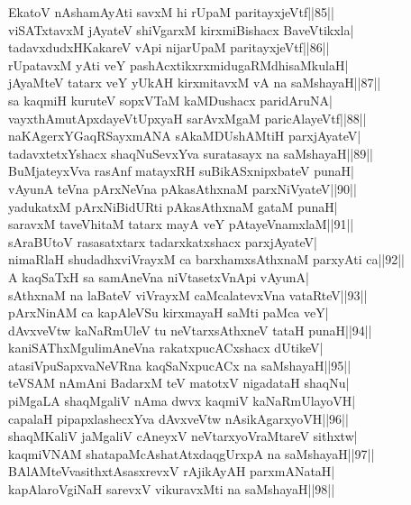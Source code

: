 \documentclass{article}
\begin{document}
EkatoV nAshamAyAti savxM hi rUpaM paritayxjeVtf||85||\\
viSATxtavxM jAyateV shiVgarxM kirxmiBishacx BaveVtikxla|\\
tadavxdudxHKakareV vApi nijarUpaM paritayxjeVtf||86||\\
rUpatavxM yAti veY pashAcxtikxrxmidugaRMdhisaMkulaH|\\
jAyaMteV tatarx veY yUkAH kirxmitavxM vA na saMshayaH||87||\\
sa kaqmiH kuruteV sopxVTaM kaMDushacx paridAruNA|\\
vayxthAmutApxdayeVtUpxyaH sarAvxMgaM paricAlayeVtf||88||\\
naKAgerxYGaqRSayxmANA sAkaMDUshAMtiH parxjAyateV|\\
tadavxtetxYshacx shaqNuSevxYva suratasayx na saMshayaH||89||\\
BuMjateyxVva rasAnf matayxRH suBikASxnipxbateV punaH|\\
vAyunA teVna pArxNeVna pAkasAthxnaM parxNiVyateV||90||\\
yadukatxM pArxNiBidURti pAkasAthxnaM gataM punaH|\\
saravxM taveVhitaM tatarx mayA veY pAtayeVnamxlaM||91||\\
sAraBUtoV rasasatxtarx tadarxkatxshacx parxjAyateV|\\
nimaRlaH shudadhxviVrayxM ca barxhamxsAthxnaM parxyAti ca||92||\\
A kaqSaTxH sa samAneVna niVtasetxVnApi vAyunA|\\
sAthxnaM na laBateV viVrayxM caMcalatevxVna vataRteV||93||\\
pArxNinAM ca kapAleVSu kirxmayaH saMti paMca veY|\\
dAvxveVtw kaNaRmUleV tu neVtarxsAthxneV tataH punaH||94||\\
kaniSAThxMgulimAneVna rakatxpucACxshacx dUtikeV|\\
atasiVpuSapxvaNeVRna kaqSaNxpucACx na saMshayaH||95||\\
teVSAM nAmAni BadarxM teV matotxV nigadataH shaqNu|\\
piMgaLA shaqMgaliV nAma dwvx kaqmiV kaNaRmUlayoVH|\\
capalaH pipapxlashecxYva dAvxveVtw nAsikAgarxyoVH||96||\\
shaqMKaliV jaMgaliV cAneyxV neVtarxyoVraMtareV sithxtw|\\
kaqmiVNAM shatapaMcAshatAtxdaqgUrxpA na saMshayaH||97||\\
BAlAMteVvasithxtAsasxrevxV rAjikAyAH parxmANataH|\\
kapAlaroVgiNaH sarevxV vikuravxMti na saMshayaH||98||\\
\end{document}
